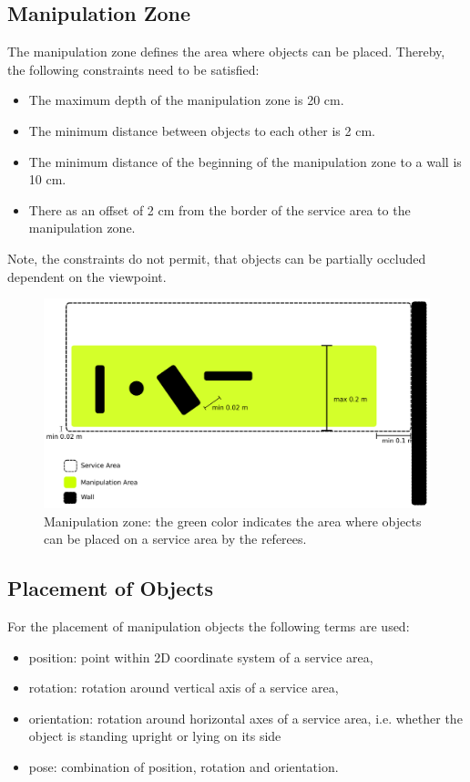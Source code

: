 \subsection{Manipulation Zone} \label{ssec:ManipulationZone}
The manipulation zone defines the area where objects can be placed. Thereby, the following constraints need to be satisfied:
\begin{itemize}
	\item The maximum depth of the manipulation zone is 20 cm.
	\item The minimum distance between objects to each other is 2 cm.
	\item The minimum distance of the beginning of the manipulation zone to a wall is 10 cm.
	\item There as an offset of 2 cm from the border of the service area to the manipulation zone.
\end{itemize}
Note, the constraints do not permit, that objects can be partially occluded dependent on the viewpoint.
\begin{figure} [h!]
\centering
\includegraphics[width=1.0\textwidth ]{./images/manipulation_zone.pdf}
\caption{Manipulation zone: the green color indicates the area where objects can be placed on a service area by the referees.}
\label{fig:manipulation_zone}
\end{figure}




\subsection{Placement of Objects}
For the placement of manipulation objects the following terms are used:

\begin{itemize}
\item position: point within 2D coordinate system of a service area,
\item rotation: rotation around vertical axis of a service area,
\item orientation: rotation around horizontal axes of a service area, i.e. whether the object is standing upright or lying on its side
\item pose: combination of position, rotation and orientation.
\end{itemize}

